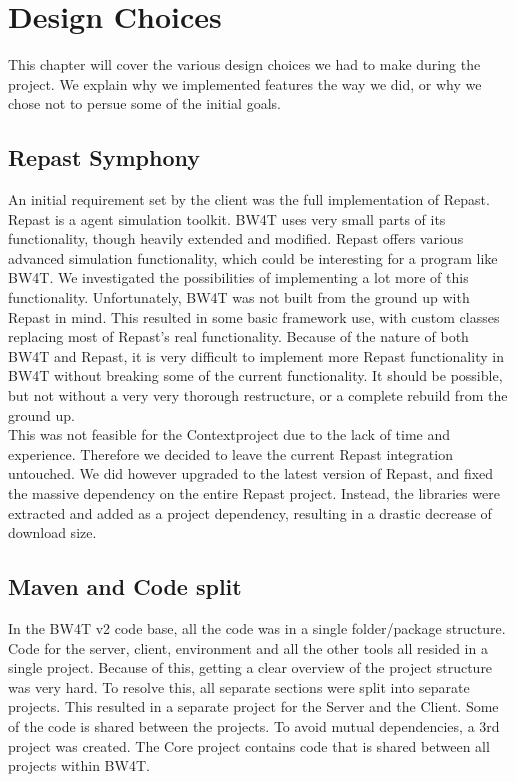 \label{Design}
\chapter{Design Choices}
This chapter will cover the various design choices we had to make during the project. We explain why we implemented features the way we did, or why we chose not to persue some of the initial goals. 

\section{Repast Symphony}
An initial requirement set by the client was the full implementation of Repast. Repast is a agent simulation toolkit. BW4T uses very small parts of its functionality, though heavily extended and modified. Repast offers various advanced simulation functionality, which could be interesting for a program like BW4T. We investigated the possibilities of implementing a lot more of this functionality. Unfortunately, BW4T was not built from the ground up with Repast in mind. This resulted in some basic framework use, with custom classes replacing most of Repast's real functionality. Because of the nature of both BW4T and Repast, it is very difficult to implement more Repast functionality in BW4T without breaking some of the current functionality. It should be possible, but not without a very very thorough restructure, or a complete rebuild from the ground up. \\

This was not feasible for the Contextproject due to the lack of time and experience. Therefore we decided to leave the current Repast integration untouched. We did however upgraded to the latest version of Repast, and fixed the massive dependency on the entire Repast project. Instead, the libraries were extracted and added as a project dependency, resulting in a drastic decrease of download size. 

\section{Maven and Code split} %
In the BW4T v2 code base, all the code was in a single folder/package structure. Code for the server, client, environment and all the other tools all resided in a single project. Because of this, getting a clear overview of the project structure was very hard. To resolve this, all separate sections were split into separate projects. This resulted in a separate project for the Server and the Client. Some of the code is shared between the projects. To avoid mutual dependencies, a 3rd project was created. The Core project contains code that is shared between all projects within BW4T. 

